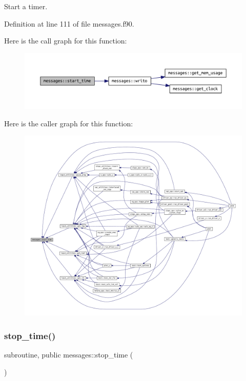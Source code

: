 Start a timer. 



Definition at line 111 of file messages.\+f90.

Here is the call graph for this function\+:\nopagebreak
\begin{figure}[H]
\begin{center}
\leavevmode
\includegraphics[width=350pt]{namespacemessages_a84d5988f3ea5ca8dc2834032f896ae90_cgraph}
\end{center}
\end{figure}
Here is the caller graph for this function\+:\nopagebreak
\begin{figure}[H]
\begin{center}
\leavevmode
\includegraphics[width=350pt]{namespacemessages_a84d5988f3ea5ca8dc2834032f896ae90_icgraph}
\end{center}
\end{figure}
\mbox{\label{namespacemessages_aed343894ae4a28ad6dfbd1d39aac64ff}} 
\subsubsection{\texorpdfstring{stop\+\_\+time()}{stop\_time()}}
{\footnotesize\ttfamily subroutine, public messages\+::stop\+\_\+time (\begin{DoxyParamCaption}{ }\end{DoxyParamCaption})}



